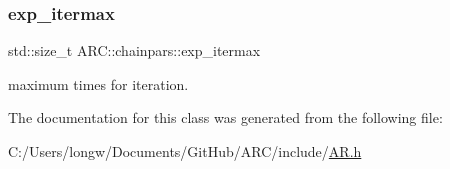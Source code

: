 \subsubsection{\texorpdfstring{exp\+\_\+itermax}{exp\_itermax}}
{\footnotesize\ttfamily std\+::size\+\_\+t A\+R\+C\+::chainpars\+::exp\+\_\+itermax}



maximum times for iteration. 



The documentation for this class was generated from the following file\+:\begin{DoxyCompactItemize}
\item 
C\+:/\+Users/longw/\+Documents/\+Git\+Hub/\+A\+R\+C/include/\hyperlink{AR_8h}{A\+R.\+h}\end{DoxyCompactItemize}
